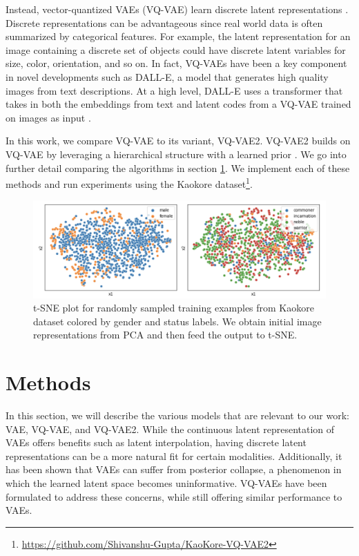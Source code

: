 \documentclass{article}
\begin{document}
Instead, vector-quantized VAEs (VQ-VAE) learn discrete latent representations \cite{VQ_VAE}. Discrete representations can be advantageous since real world data is often summarized by categorical features. For example, the latent representation for an image containing a discrete set of objects could have discrete latent variables for size, color, orientation, and so on. In fact, VQ-VAEs have been a key component in novel developments such as DALL-E, a model that generates high quality images from text descriptions. At a high level, DALL-E uses a transformer that takes in both the embeddings from text and latent codes from a VQ-VAE trained on images as input \cite{DALLE}.

In this work, we compare VQ-VAE to its variant, VQ-VAE2. VQ-VAE2 builds on VQ-VAE by leveraging a hierarchical structure with a learned prior \cite{VQ_VAE2}. We go into further detail comparing the algorithms in section \ref{methods}. We implement each of these methods and run experiments using the Kaokore dataset\footnote{\url{https://github.com/Shivanshu-Gupta/KaoKore-VQ-VAE2}}. 

\begin{figure}
    \centering
    \includegraphics[width=0.7\linewidth]{clustering.png}
    \caption{t-SNE plot for randomly sampled training examples from Kaokore dataset colored by gender and status labels. We obtain initial image representations from PCA and then feed the output to t-SNE.}
    \label{fig:clustering}
\end{figure} 

\section{Methods} \label{methods}

In this section, we will describe the various models that are relevant to our work: VAE, VQ-VAE, and VQ-VAE2. While the continuous latent representation of VAEs offers benefits such as latent interpolation, having discrete latent representations can be a more natural fit for certain modalities. Additionally, it has been shown that VAEs can suffer from posterior collapse, a phenomenon in which the learned latent space becomes uninformative. VQ-VAEs have been formulated to address these concerns, while still offering similar performance to VAEs. 
\end{document}
